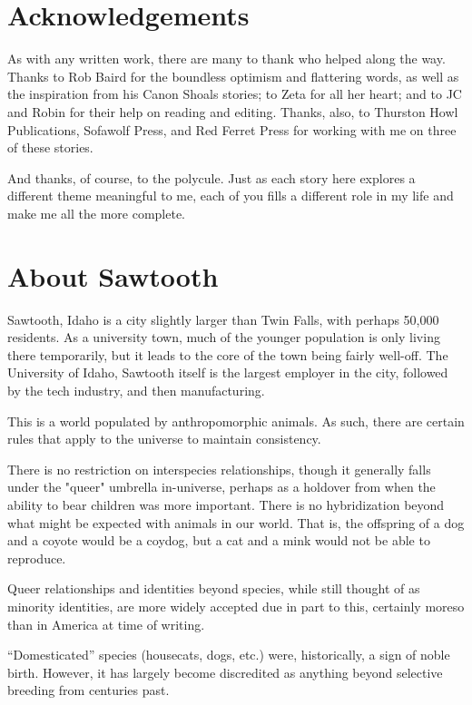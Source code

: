 \chapter*{Acknowledgements}

As with any written work, there are many to thank who helped along the way. Thanks to Rob Baird for the boundless optimism and flattering words, as well as the inspiration from his Canon Shoals stories; to Zeta for all her heart; and to JC and Robin for their help on reading and editing. Thanks, also, to Thurston Howl Publications, Sofawolf Press, and Red Ferret Press for working with me on three of these stories.

And thanks, of course, to the polycule. Just as each story here explores a different theme meaningful to me, each of you fills a different role in my life and make me all the more complete.

\chapter*{About Sawtooth}

\vspace{0.4cm}

Sawtooth, Idaho is a city slightly larger than Twin Falls, with perhaps 50,000 residents. As a university town, much of the younger population is only living there temporarily, but it leads to the core of the town being fairly well-off. The University of Idaho, Sawtooth itself is the largest employer in the city, followed by the tech industry, and then manufacturing.

This is a world populated by anthropomorphic animals. As such, there are certain rules that apply to the universe to maintain consistency.

There is no restriction on interspecies relationships, though it generally falls under the "queer" umbrella in-universe, perhaps as a holdover from when the ability to bear children was more important. There is no hybridization beyond what might be expected with animals in our world. That is, the offspring of a dog and a coyote would be a coydog, but a cat and a mink would not be able to reproduce.

Queer relationships and identities beyond species, while still thought of as minority identities, are more widely accepted due in part to this, certainly moreso than in America at time of writing.

``Domesticated'' species (housecats, dogs, etc.) were, historically, a sign of noble birth. However, it has largely become discredited as anything beyond selective breeding from centuries past.

